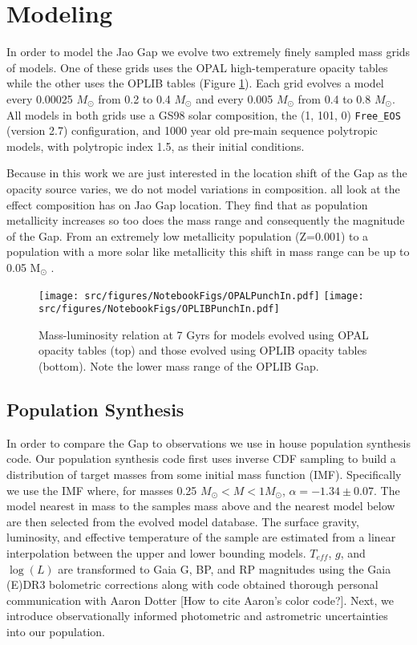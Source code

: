 \section{Modeling}\label{sec:modeling}
In order to model the Jao Gap we evolve two extremely finely sampled mass grids
of models. One of these grids uses the OPAL high-temperature opacity tables
while the other uses the OPLIB tables (Figure \ref{fig:PunchIn}). Each grid
evolves a model every 0.00025 $M_{\odot}$ from 0.2 to 0.4 $M_{\odot}$ and every
0.005 $M_{\odot}$ from 0.4 to 0.8 $M_{\odot}$. All models in both grids use a
GS98 solar composition, the (1, 101, 0) \texttt{Free\_EOS} (version
{\color{red}2.7}) configuration, and 1000 year old pre-main sequence polytropic
models, with polytropic index 1.5, as their initial conditions.

Because in this work we are just interested in the location shift of the Gap as
the opacity source varies, we do not model variations in composition.
\citet{Mansfield2021,Jao2020,Feiden2021} all look at the effect composition has
on Jao Gap location. They find that as population metallicity increases so too
does the mass range and consequently the magnitude of the Gap. From an extremely
low metallicity population (Z=0.001) to a population with a more solar like
metallicity this shift in mass range can be up to 0.05 M$_{\odot}$
\citep{Mansfield2021}.

\begin{figure}
	\centering
	\texttt{[image: src/figures/NotebookFigs/OPALPunchIn.pdf]}
	\texttt{[image: src/figures/NotebookFigs/OPLIBPunchIn.pdf]}
	\caption{Mass-luminosity relation at 7 Gyrs for models evolved using OPAL opacity
	tables (top) and those evolved using OPLIB opacity tables (bottom). Note
	the lower mass range of the OPLIB Gap.}
	\label{fig:PunchIn}
		
\end{figure}

\subsection{Population Synthesis}
In order to compare the Gap to observations we use in house population
synthesis code. Our population synthesis code first uses inverse CDF sampling
to build a distribution of target masses from some initial mass function (IMF).
Specifically we use the \citet{Sollima2019} IMF where, for masses 0.25
$M_{\odot} < M < 1 M_{\odot}$, $\alpha=-1.34\pm0.07$. The model nearest in mass
to the samples mass above and the nearest model below are then selected from
the evolved model database. The surface gravity, luminosity, and effective
temperature of the sample are estimated from a linear interpolation between the
upper and lower bounding models. $T_{eff}$, $g$, and $\log(L)$ are transformed
to Gaia G, BP, and RP magnitudes using the Gaia (E)DR3 bolometric corrections
\citep{Creevey2022} along with code obtained thorough personal communication
with Aaron Dotter {\color{red}[How to cite Aaron's color code?]}. Next, we
introduce observationally informed photometric and astrometric uncertainties
into our population.


